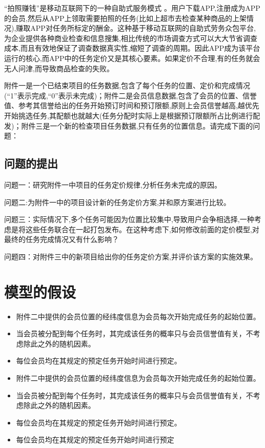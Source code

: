 \documentclass{cumcmthesis}
\begin{document}
``拍照赚钱''是移动互联网下的一种自助式服务模式 \cite{bib:one,bib:two,bib:three,bib:four}。用户下载APP,注册成为APP的会员,然后从APP上领取需要拍照的任务(比如上超市去检查某种商品的上架情况),赚取APP对任务所标定的酬金。这种基于移动互联网的自助式劳务众包平台,为企业提供各种商业检查和信息搜集,相比传统的市场调查方式可以大大节省调查成本,而且有效地保证了调查数据真实性,缩短了调查的周期。因此APP成为该平台运行的核心,而APP中的任务定价又是其核心要素。如果定价不合理,有的任务就会无人问津,而导致商品检查的失败。


附件一是一个已结束项目的任务数据,包含了每个任务的位置、定价和完成情况(``1''表示完成,``0''表示未完成)；附件二是会员信息数据,包含了会员的位置、信誉值、参考其信誉给出的任务开始预订时间和预订限额,原则上会员信誉越高,越优先开始挑选任务,其配额也就越大(任务分配时实际上是根据预订限额所占比例进行配发)；附件三是一个新的检查项目任务数据,只有任务的位置信息。请完成下面的问题：


\subsection{问题的提出}
问题一：研究附件一中项目的任务定价规律,分析任务未完成的原因。

问题二:为附件一中的项目设计新的任务定价方案,并和原方案进行比较。

问题三：实际情况下,多个任务可能因为位置比较集中,导致用户会争相选择,一种考虑是将这些任务联合在一起打包发布。在这种考虑下,如何修改前面的定价模型,对最终的任务完成情况又有什么影响？

问题四：对附件三中的新项目给出你的任务定价方案,并评价该方案的实施效果。

\section{模型的假设}
\begin{itemize}
\item 附件二中提供的会员位置的经纬度信息为会员每次开始完成任务的起始位置。 
\item 当会员被分配到每个任务时，其完成该任务的概率只与会员信誉值有关，不考虑除此之外的随机因素。 
\item 每位会员均在其规定的预定任务开始时间进行预定。
\item 附件二中提供的会员位置的经纬度信息为会员每次开始完成任务的起始位置。 
\item 当会员被分配到每个任务时，其完成该任务的概率只与会员信誉值有关，不考虑除此之外的随机因素。 
\item 每位会员均在其规定的预定任务开始时间进行预定。
\item 每位会员均在其规定的预定任务开始时间进行预定
\end{itemize}
\end{document}
